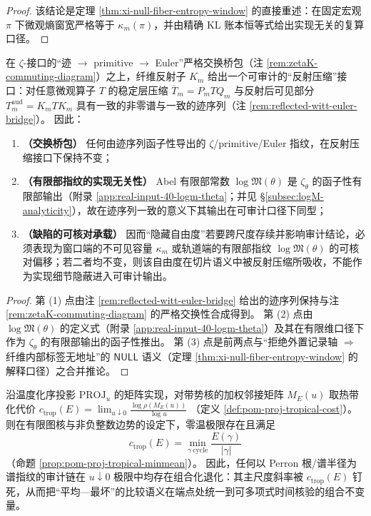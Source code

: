 \begin{proof}
该结论是定理 \ref{thm:xi-null-fiber-entropy-window} 的直接重述：在固定宏观 \(\pi\) 下微观熵窗宽严格等于 \(\kappa_m(\pi)\)，并由精确 KL 账本恒等式给出实现无关的复算口径。
\end{proof}

\begin{theorem}\label{thm:xi-defect-window-orbit-bridge}
在 \(\zeta\)-接口的“迹 \(\to\) primitive \(\to\) Euler”严格交换桥包（注 \ref{rem:zetaK-commuting-diagram}）之上，纤维反射子 \(K_m\) 给出一个可审计的“反射压缩”接口：对任意微观算子 \(T\) 的稳定层压缩 \(\overline T_m=P_mTQ_m\) 与反射后可见部分 \(T_m^{\mathrm{aud}}=K_mTK_m\) 具有一致的非零谱与一致的迹序列（注 \ref{rem:reflected-witt-euler-bridge}）。
因此：
\begin{enumerate}
  \item \textbf{（交换桥包）}
  任何由迹序列函子性导出的 \(\zeta\)/primitive/Euler 指纹，在反射压缩接口下保持不变；
  \item \textbf{（有限部指纹的实现无关性）}
  Abel 有限部常数 \(\log\mathfrak{M}(\theta)\) 是 \(\zeta_\theta\) 的函子性有限部输出（附录 \ref{app:real-input-40-logm-theta}；并见 \S\ref{subsec:logM-analyticity}），故在迹序列一致的意义下其输出在可审计口径下同型；
  \item \textbf{（缺陷的可核对承载）}
  因而“隐藏自由度”若要跨尺度存续并影响审计结论，必须表现为窗口端的不可见容量 \(\kappa_m\) 或轨道端的有限部指纹 \(\log\mathfrak{M}(\theta)\) 的可核对偏移；若二者均不变，则该自由度在切片语义中被反射压缩所吸收，不能作为实现细节隐蔽进入可审计输出。
\end{enumerate}
\end{theorem}

\begin{proof}
第 (1) 点由注 \ref{rem:reflected-witt-euler-bridge} 给出的迹序列保持与注 \ref{rem:zetaK-commuting-diagram} 的严格交换性合成得到。
第 (2) 点由 \(\log\mathfrak{M}(\theta)\) 的定义式（附录 \ref{app:real-input-40-logm-theta}）及其在有限维口径下作为 \(\zeta_\theta\) 的有限部输出的函子性推出。
第 (3) 点是前两点与“拒绝外置记录轴 \(\Rightarrow\) 纤维内部标签无地址”的 \(\mathsf{NULL}\) 语义（定理 \ref{thm:xi-null-fiber-entropy-window} 的解释口径）之合并推论。
\end{proof}

\begin{theorem}\label{thm:xi-zero-temp-comparability}
沿温度化序投影 \(\mathrm{PROJ}_u\) 的矩阵实现，对带势核的加权邻接矩阵 \(M_E(u)\) 取热带化代价
\(
c_{\mathrm{trop}}(E)=\lim_{u\downarrow 0}\frac{\log\rho(M_E(u))}{\log u}
\)
（定义 \ref{def:pom-proj-tropical-cost}）。
则在有限图核与非负整数边势的设定下，零温极限存在且满足
\[
c_{\mathrm{trop}}(E)=\min_{\gamma\ \mathrm{cycle}}\frac{E(\gamma)}{|\gamma|}
\]
（命题 \ref{prop:pom-proj-tropical-minmean}）。
因此，任何以 Perron 根/谱半径为谱指纹的审计链在 \(u\downarrow 0\) 极限中均存在组合化退化：其主尺度斜率被 \(c_{\mathrm{trop}}(E)\) 钉死，从而把“平均—最坏”的比较语义在端点处统一到可多项式时间核验的组合不变量。
\end{theorem}

